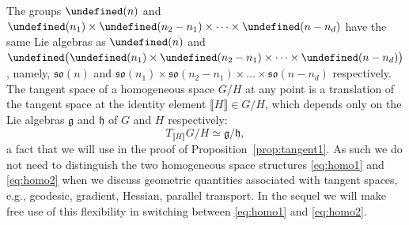 \documentclass[11pt,reqno]{amsart}%
\theoremstyle{definition}
\theoremstyle{remark}
\newcommand{\lb}{\llbracket}
\newcommand{\rb}{\rrbracket}
\let\O\undefined
\let\S\undefined
\let\SO\undefined
\DeclareMathOperator{\O}{O}
\DeclareMathOperator{\S}{S}
\DeclareMathOperator{\SO}{SO}
\begin{document}
The groups $\O(n)$ and $\O(n_1) \times \O(n_2-n_1)\times \cdots \times \O(n - n_d)$ have the same Lie algebras as $\SO(n)$ and $\S\bigl(\O(n_1) \times \O(n_2-n_1)\times  \cdots \times  \O(n - n_d)\bigr)$, namely, $\mathfrak{so}(n)$ and $\mathfrak{so}(n_1) \times \mathfrak{so}(n_2-n_1)\times \dots \times \mathfrak{so}(n-n_d)$ respectively. The tangent space of a homogeneous space $G/H$ at any point is a translation of the tangent space at the identity element $\lb H \rb\in G/H$, which depends only on the Lie algebras $\mathfrak{g}$ and $\mathfrak{h}$ of $G$ and $H$ respectively:
\[
T_{\lb H \rb} G/H  \simeq \mathfrak{g}/\mathfrak{h},
\]
a fact that we will use in the proof of Proposition~\ref{prop:tangent1}. As such we do not need to distinguish the two homogeneous space structures \eqref{eq:homo1} and \eqref{eq:homo2} when we discuss geometric quantities associated with tangent spaces, e.g., geodesic, gradient, Hessian, parallel transport. In the sequel we will make free use of this flexibility in switching between \eqref{eq:homo1} and \eqref{eq:homo2}.
\end{document}
